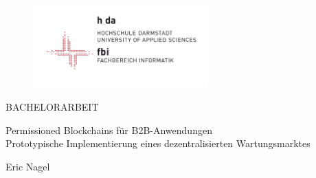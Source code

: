 \pagestyle{empty} %

\begin{figure}[t]
	\centering
	\includegraphics[width=0.6\textwidth]{images/logo_fbi}
\end{figure}

\vspace*{75 pt}
\begin{center}




\Huge BACHELORARBEIT

\vspace{20 pt}


\Large Permissioned Blockchains für B2B-Anwendungen \\ 
\normalsize Prototypische Implementierung eines dezentralisierten Wartungsmarktes \\

\vspace{75 pt}



Eric Nagel \\
\vspace{80 pt}


\end{center}
